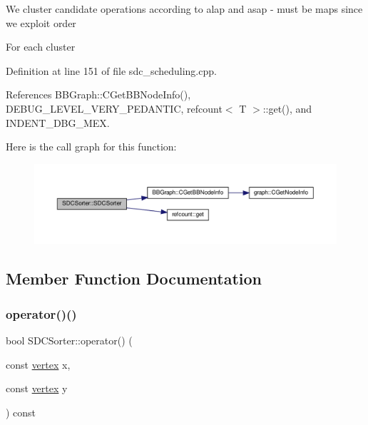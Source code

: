 We cluster candidate operations according to alap and asap -\/ must be maps since we exploit order

For each cluster 

Definition at line 151 of file sdc\+\_\+scheduling.\+cpp.



References B\+B\+Graph\+::\+C\+Get\+B\+B\+Node\+Info(), D\+E\+B\+U\+G\+\_\+\+L\+E\+V\+E\+L\+\_\+\+V\+E\+R\+Y\+\_\+\+P\+E\+D\+A\+N\+T\+IC, refcount$<$ T $>$\+::get(), and I\+N\+D\+E\+N\+T\+\_\+\+D\+B\+G\+\_\+\+M\+EX.

Here is the call graph for this function\+:
\nopagebreak
\begin{figure}[H]
\begin{center}
\leavevmode
\includegraphics[width=350pt]{da/d1f/classSDCSorter_ac147ee06edf66d529a7cf9547aedd233_cgraph}
\end{center}
\end{figure}


\subsection{Member Function Documentation}
\mbox{\label{classSDCSorter_a4829b20e9992b79a4c086a6d50415ed8}} 
\subsubsection{\texorpdfstring{operator()()}{operator()()}}
{\footnotesize\ttfamily bool S\+D\+C\+Sorter\+::operator() (\begin{DoxyParamCaption}\item[{const \hyperlink{graph_8hpp_abefdcf0544e601805af44eca032cca14}{vertex}}]{x,  }\item[{const \hyperlink{graph_8hpp_abefdcf0544e601805af44eca032cca14}{vertex}}]{y }\end{DoxyParamCaption}) const\hspace{0.3cm}{\ttfamily [inline]}}



